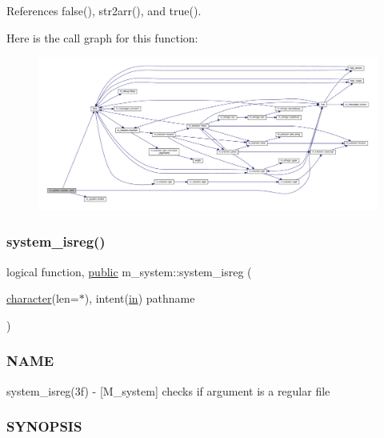 References false(), str2arr(), and true().

Here is the call graph for this function\+:
\nopagebreak
\begin{figure}[H]
\begin{center}
\leavevmode
\includegraphics[width=350pt]{namespacem__system_ab05694cc3d76a3ecc87e4b4490c4c217_cgraph}
\end{center}
\end{figure}
\mbox{\label{namespacem__system_a127bdd84ccd4b52f3f29abbc56af029b}} 
\subsubsection{\texorpdfstring{system\+\_\+isreg()}{system\_isreg()}}
{\footnotesize\ttfamily logical function, \hyperlink{M__stopwatch_83_8txt_a2f74811300c361e53b430611a7d1769f}{public} m\+\_\+system\+::system\+\_\+isreg (\begin{DoxyParamCaption}\item[{\hyperlink{option__stopwatch_83_8txt_abd4b21fbbd175834027b5224bfe97e66}{character}(len=$\ast$), intent(\hyperlink{M__journal_83_8txt_afce72651d1eed785a2132bee863b2f38}{in})}]{pathname }\end{DoxyParamCaption})}



\subsubsection*{N\+A\+ME}

system\+\_\+isreg(3f) -\/ \mbox{[}M\+\_\+system\mbox{]} checks if argument is a regular file 

\subsubsection*{S\+Y\+N\+O\+P\+S\+IS}

